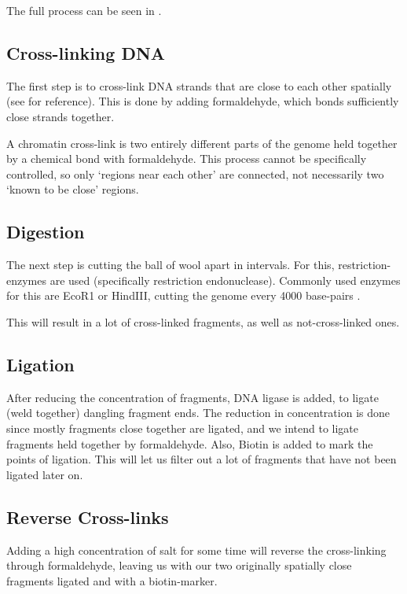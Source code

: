 The full process can be seen in .

\subsection{Cross-linking DNA}\label{sec:crosslinking}

The first step is to cross-link DNA strands that are close to each other
spatially (see  for reference). This is done by adding
formaldehyde, which bonds sufficiently close strands together.

A chromatin cross-link is two entirely different parts of the genome held
together by a chemical bond with formaldehyde. This process cannot be
specifically controlled, so only `regions near each other' are connected, not
necessarily two `known to be close' regions.

\subsection{Digestion}\label{sec:digestion}

The next step is cutting the ball of wool apart in intervals. For this,
restriction-enzymes are used (specifically restriction endonuclease). Commonly
used enzymes for this are EcoR1 or HindIII, cutting the genome every 4000 base-pairs
.

This will result in a lot of cross-linked fragments, as well as not-cross-linked ones.

\subsection{Ligation}\label{sec:ligation}

After reducing the concentration of fragments, DNA ligase is added, to ligate
(weld together) dangling fragment ends. The reduction in concentration is done
since mostly fragments close together are ligated, and we intend to ligate
fragments held together by formaldehyde. Also, Biotin is added to mark the
points of ligation. This will let us filter out a lot of fragments that have
not been ligated later on.


\subsection{Reverse Cross-links}\label{sec:revcrosslink}

Adding a high concentration of salt for some time will reverse the
cross-linking through formaldehyde, leaving us with our two originally
spatially close fragments ligated and with a biotin-marker.

